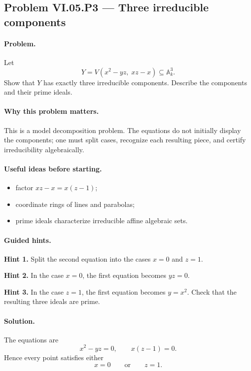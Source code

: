 \subsection*{Problem VI.05.P3 --- Three irreducible components}
\label{prob:vi-05-p3}

\paragraph{Problem.}
\label{prob:vi05-p3}
Let
\[
Y
=
V(x^2-yz,\;xz-x)
\subseteq
\mathbb A_k^3.
\]
Show that \(Y\) has exactly three irreducible components.  Describe the components and their
prime ideals.

\ifdefined\FullProblemDossiers

\paragraph{Why this problem matters.}
This is a model decomposition problem.  The equations do not initially display the
components; one must split cases, recognize each resulting piece, and certify irreducibility
algebraically.

\paragraph{Useful ideas before starting.}
\begin{itemize}
\item factor \(xz-x=x(z-1)\);
\item coordinate rings of lines and parabolas;
\item prime ideals characterize irreducible affine algebraic sets.
\end{itemize}

\paragraph{Guided hints.}
\textbf{Hint 1.} Split the second equation into the cases \(x=0\) and \(z=1\).

\textbf{Hint 2.} In the case \(x=0\), the first equation becomes \(yz=0\).

\textbf{Hint 3.} In the case \(z=1\), the first equation becomes \(y=x^2\).
Check that the resulting three ideals are prime.

\paragraph{Solution.}
The equations are
\[
x^2-yz=0,
\qquad
x(z-1)=0.
\]
Hence every point satisfies either
\[
x=0
\qquad\text{or}\qquad
z=1.
\]

